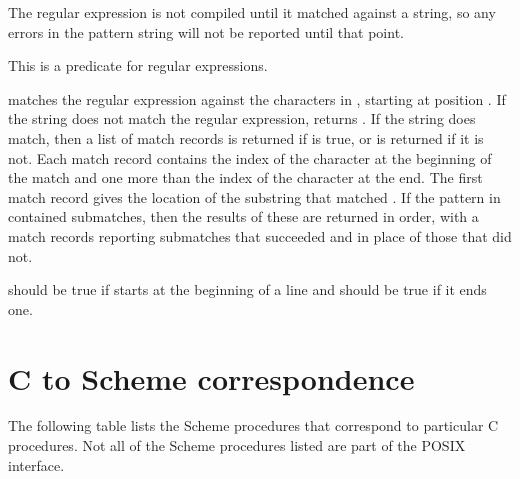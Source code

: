 The regular expression is not compiled until it matched against a string,
 so any errors in the pattern string will not be reported until that
 point.

\begin{protos}
\end{protos}
\noindent
This is a predicate for regular expressions.

\begin{protos}
\end{protos}
\noindent
{} matches the regular expression against the characters
 in , starting at position .
If the string does not match the regular expression, 
 returns .
If the string does match, then a list of match records is returned
 if  is true, or  is returned if it is not.
Each match record contains the index of the character at the beginning
 of the match and one more than the index of the character at the end.
The first match record gives the location of the substring that matched
 .
If the pattern in  contained submatches, then the results
 of these are returned in order, with a match records reporting submatches
 that succeeded and  in place of those that did not.

 should be true if  starts at the beginning
 of a line and  should be true if it ends one.

\section{C to Scheme correspondence}
\label{function-correspondence}

The following table lists the Scheme procedures that correspond to
 particular C procedures.
Not all of the Scheme procedures listed are part of the POSIX interface.

